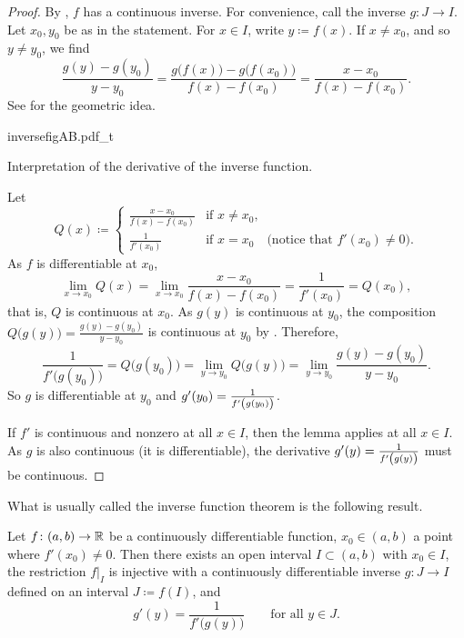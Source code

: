\begin{proof}
By , $f$ has a continuous inverse.  For convenience,
call the inverse $g \colon J \to I$.
Let $x_0,y_0$ be as in the statement.  For $x \in I$, write $y \coloneqq f(x)$.
If $x \not= x_0$, and so $y \not= y_0$, we find
\begin{equation*}
\frac{g(y)-g(y_0)}{y-y_0} =
\frac{g\bigl(f(x)\bigr)-g\bigl(f(x_0)\bigr)}{f(x)-f(x_0)} =
\frac{x-x_0}{f(x)-f(x_0)} .
\end{equation*}
See  for the geometric idea.
\begin{myfigureht}
{inversefigAB.pdf_t}
\caption{Interpretation of the derivative of the inverse
function.\label{inversefig}}
\end{myfigureht}

Let
\begin{equation*}
Q(x) \coloneqq
\begin{cases}
\frac{x-x_0}{f(x)-f(x_0)} & \text{if } x \neq x_0, \\
\frac{1}{f'(x_0)}         & \text{if } x = x_0 \quad \text{(notice that }
f'(x_0) \neq 0 \text{)}.
\end{cases}
\end{equation*}
As $f$ is differentiable at $x_0$, 
\begin{equation*}
\lim_{x \to x_0} Q(x) =
\lim_{x \to x_0} 
\frac{x-x_0}{f(x)-f(x_0)} 
=
\frac{1}{f'(x_0)}
=
Q(x_0) ,
\end{equation*}
that is, $Q$ is continuous at $x_0$.
As $g(y)$ is continuous at $y_0$,
the composition $Q\bigl(g(y)\bigr) = \frac{g(y)-g(y_0)}{y-y_0}$
is continuous at $y_0$ by
.
Therefore,
\begin{equation*}
\frac{1}{f'\bigl(g(y_0)\bigr)}
= Q\bigl(g(y_0)\bigr)
= \lim_{y \to y_0} Q\bigl(g(y)\bigr)
= \lim_{y \to y_0} \frac{g(y)-g(y_0)}{y-y_0} .
\end{equation*}
So $g$ is differentiable at $y_0$ and $g'(y_0) =
\frac{1}{f'\left(\vphantom{1^1_1}g(y_0)\right)}$.

If $f'$ is continuous and nonzero at all $x \in I$,
then the lemma applies at all $x \in I$.  As $g$ is also
continuous (it is differentiable), the derivative $g'(y) =
\frac{1}{f'\left(\vphantom{1^1_1}g(y)\right)}$ must be continuous.
\end{proof}

What is usually called the inverse function theorem is the following result.

\begin{thm}
Let $f \colon (a,b) \to {\mathbb{R}}$ be a continuously differentiable function,
$x_0 \in (a,b)$ a point where $f'(x_0) \not= 0$.  Then there exists
an open interval $I \subset (a,b)$ with $x_0 \in I$, the
restriction $f|_{I}$ is injective with a continuously differentiable inverse
$g \colon J \to I$ defined on an interval $J \coloneqq f(I)$,
and
\begin{equation*}
g'(y) = \frac{1}{f'\bigl( g(y) \bigr)} \qquad \text{for all } y \in J.
\end{equation*}
\end{thm}

